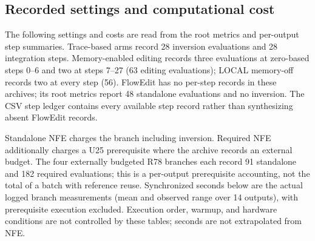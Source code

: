 \subsection{Recorded settings and computational cost}

The following settings and costs are read from the root metrics and per-output step summaries. Trace-based arms record 28 inversion evaluations and 28 integration steps. Memory-enabled editing records three evaluations at zero-based steps 0--6 and two at steps 7--27 (63 editing evaluations); LOCAL memory-off records two at every step (56). FlowEdit has no per-step records in these archives; its root metrics report 48 standalone evaluations and no inversion. The CSV step ledger contains every available step record rather than synthesizing absent FlowEdit records.

Standalone NFE charges the branch including inversion. Required NFE additionally charges a U25 prerequisite where the archive records an external budget. The four externally budgeted R78 branches each record 91 standalone and 182 required evaluations; this is a per-output prerequisite accounting, not the total of a batch with reference reuse. Synchronized seconds below are the actual logged branch measurements (mean and observed range over 14 outputs), with prerequisite execution excluded. Execution order, warmup, and hardware conditions are not controlled by these tables; seconds are not extrapolated from NFE.


